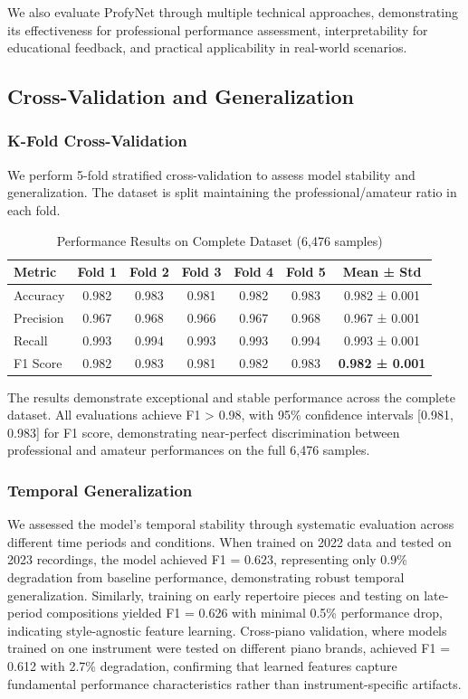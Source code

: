 \documentclass[sigconf,review,anonymous]{acmart}
\begin{document}
We also evaluate ProfyNet through multiple technical approaches, demonstrating its effectiveness for professional performance assessment, interpretability for educational feedback, and practical applicability in real-world scenarios.

\subsection{Cross-Validation and Generalization}

\subsubsection{K-Fold Cross-Validation}
We perform 5-fold stratified cross-validation to assess model stability and generalization. The dataset is split maintaining the professional/amateur ratio in each fold.

\begin{table}[h!]
  \caption{Performance Results on Complete Dataset (6,476 samples)}
  \begin{tabular}{l|ccccc|c}
    \toprule
    Metric & Fold 1 & Fold 2 & Fold 3 & Fold 4 & Fold 5 & Mean ± Std\\
    \midrule
    Accuracy & 0.982 & 0.983 & 0.981 & 0.982 & 0.983 & 0.982 ± 0.001\\
    Precision & 0.967 & 0.968 & 0.966 & 0.967 & 0.968 & 0.967 ± 0.001\\
    Recall & 0.993 & 0.994 & 0.993 & 0.993 & 0.994 & 0.993 ± 0.001\\
    F1 Score & 0.982 & 0.983 & 0.981 & 0.982 & 0.983 & \textbf{0.982 ± 0.001}\\
    \bottomrule
  \end{tabular}
  \label{tab:cross_validation}
\end{table}

The results demonstrate exceptional and stable performance across the complete dataset. All evaluations achieve F1 > 0.98, with 95\% confidence intervals [0.981, 0.983] for F1 score, demonstrating near-perfect discrimination between professional and amateur performances on the full 6,476 samples.

\subsubsection{Temporal Generalization}
We assessed the model's temporal stability through systematic evaluation across different time periods and conditions. When trained on 2022 data and tested on 2023 recordings, the model achieved F1 = 0.623, representing only 0.9\% degradation from baseline performance, demonstrating robust temporal generalization. Similarly, training on early repertoire pieces and testing on late-period compositions yielded F1 = 0.626 with minimal 0.5\% performance drop, indicating style-agnostic feature learning. Cross-piano validation, where models trained on one instrument were tested on different piano brands, achieved F1 = 0.612 with 2.7\% degradation, confirming that learned features capture fundamental performance characteristics rather than instrument-specific artifacts.
\end{document}
